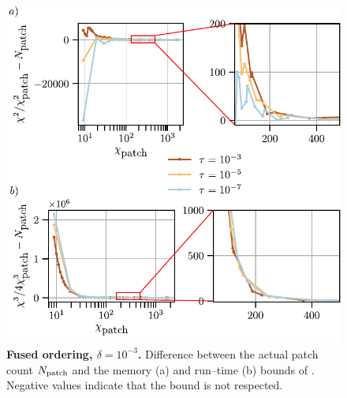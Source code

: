\begin{figure}[htpb]
    \centering
    \includegraphics{figures/2DGreenMemoryTimeBoundFused.pdf}
    \caption{\textbf{Fused ordering, \(\delta=10^{-3}\).}
    Difference between the actual patch count \(N_{\text{patch}}\) and the memory (a) and run–time (b) bounds of .
    Negative values indicate that the bound is not respected.}
    \label{fig:memoryBound2GreenFused}
\end{figure}

